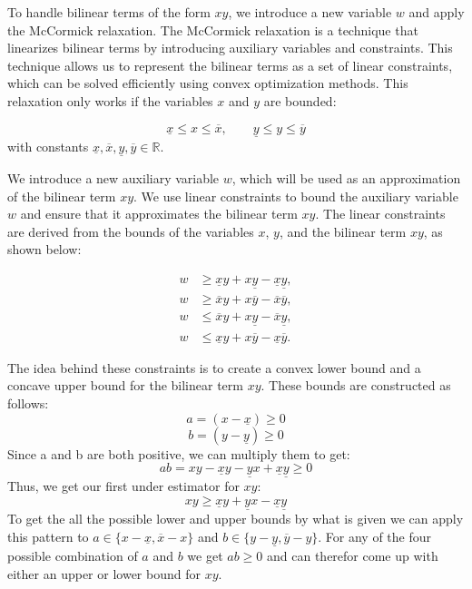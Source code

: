 To handle bilinear terms of the form \(xy\), we introduce a new variable \(w\) and apply the McCormick relaxation.
The McCormick relaxation is a technique that linearizes bilinear terms by introducing auxiliary variables and constraints.
This technique allows us to represent the bilinear terms as a set of linear constraints, which can be solved efficiently using convex optimization
methods.
This relaxation only works if the variables \(x\) and \(y\) are bounded:

\[ \underline{x} \leq x \leq \overline{x}, \qquad
	\underline{y} \leq y \leq \overline{y} \] with constants \(\underline{x}, \overline{x}, \underline{y}, \overline{y} \in \mathbb{R}\).

We introduce a new auxiliary variable \(w\), which will be used as an approximation of the bilinear term \(xy\).
We use linear constraints to bound the auxiliary variable \(w\) and ensure that it approximates the bilinear term \(xy\).
The linear constraints are derived from the bounds of the variables \(x\), \(y\), and the bilinear term \(xy\), as shown below:

\[
	\begin{aligned}
		w & \geq \underline{x} y + x \underline{y} - \underline{x} \underline{y}, \\
		w & \geq \overline{x} y + x \overline{y} - \overline{x} \overline{y},     \\
		w & \leq \overline{x} y + x \underline{y} - \overline{x} \underline{y},   \\
		w & \leq \underline{x} y + x \overline{y} - \underline{x} \overline{y}.
	\end{aligned}
\]

The idea behind these constraints is to create a convex lower bound and a concave upper bound for the bilinear term \(xy\).
These bounds are constructed as follows: \[ a = (x - \underline{x}) \geq 0 \] \[ b = (y - \underline{y}) \geq 0 \] Since a and b are both positive,
we can multiply them to get: \[ ab = xy - \underline{x}y - \underline{y}x + \underline{x}\underline{y} \geq 0 \] Thus, we get our first under
estimator for $xy$: \[ xy \geq \underline{x}y + \underline{y}x - \underline{x}\underline{y} \] To get the all the possible lower and upper bounds by
what is given we can apply this pattern to $a\in\{x - \underline{x}, \overline{x} - x\}$ and $b\in\{y - \underline{y}, \overline{y} - y\}$.
For any of the four possible combination of $a$ and $b$ we get $ab\geq0$ and can therefor come up with either an upper or lower bound for $xy$.

